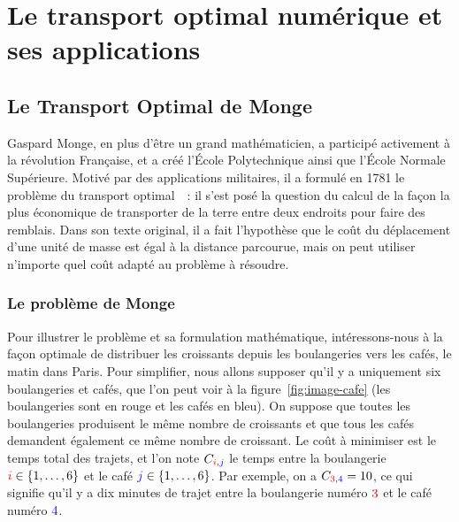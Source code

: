

\newcommand{\Blu}[1]{{\color{blue}#1}}
\newcommand{\Red}[1]{{\color{red}#1}}
\newcommand{\iC}{\Red{i}}
\newcommand{\jC}{\Blu{j}}
\newcommand{\aC}{\Red{a}}
\newcommand{\bC}{\Blu{b}}


\ifdefined\otarticle
\newcommand{\myparagraph}[1]{\subsection{#1}}
\else
\newcommand{\myparagraph}[1]{\paragraph{#1}}
\chapter{Le transport optimal numérique et ses applications}
\fi

\label{chap-ot}


\section{Le Transport Optimal de Monge}

Gaspard Monge, en plus d'être un grand mathématicien, a participé activement à la révolution Française, et a créé l'\'Ecole Polytechnique ainsi que l'\'Ecole Normale Supérieure. Motivé par des applications militaires, il a formulé en 1781 le problème du transport optimal~\cite{Monge1781}~: il s'est posé la question du calcul de la façon la plus économique de transporter de la terre entre deux endroits pour faire des remblais. Dans son texte original, il a fait l'hypothèse que le coût du déplacement d'une unité de masse est égal à la distance parcourue, mais on peut utiliser n'importe quel coût adapté au problème à résoudre. 

\myparagraph{Le problème de Monge}

Pour illustrer le problème et sa formulation mathématique, intéressons-nous à la façon optimale de distribuer les croissants depuis les boulangeries vers les cafés, le matin dans Paris. Pour simplifier, nous allons supposer qu'il y a uniquement six boulangeries et cafés, que l'on peut voir à la figure~\ref{fig:image-cafe} (les boulangeries sont en \Red{rouge} et les cafés en \Blu{bleu}). 
%
On suppose que toutes les boulangeries produisent le même nombre de croissants et que tous les cafés demandent également ce même nombre de croissant.
%
Le coût à minimiser est le temps total des trajets, et l'on note $C_{\iC,\jC}$ le temps entre la boulangerie $\iC \in \{1,\ldots,6\}$  et le café $\jC \in \{1,\ldots,6\}$. Par exemple, on a $C_{\Red{3},\Blu{4}}=10$, ce qui signifie qu'il y a dix minutes de trajet entre la boulangerie numéro $\Red{3}$ et le café numéro $\Blu{4}$. 

